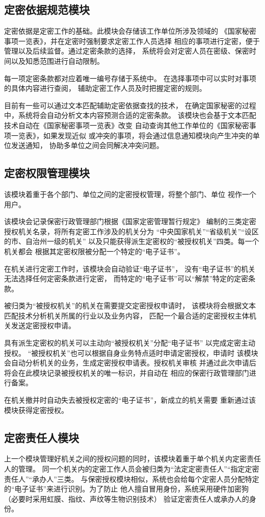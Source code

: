 \subsection{定密依据规范模块}
定密依据是定密工作的基础。此模块会存储该工作单位所涉及领域的
《国家秘密事项一览表》，并在定密时强制要求定密工作人员选择
相应的事项进行定密，便于管理以及后续监督。通过定密条款的选择，
系统将会对定密人员在密级、保密时间以及知悉范围进行自动限制。

每一项定密条款都对应着唯一编号存储于系统中。
在选择事项中可以实时对事项的具体内容进行查阅，
辅助定密工作人员及时把握定密的规则。

目前有一些可以通过文本匹配辅助定密依据查找的技术\cite{yizhonggenjuwendang}，
在确定国家秘密的过程中，系统将会自动分析文本内容预测合适的定密条款。
该模块也会基于文本匹配技术自动在《国家秘密事项一览表》改变
自动查询其他工作单位的《国家秘密事项一览表》，如果发现近似
或冲突的事项，将会通过信息通知模块向产生冲突的单位发送通知，
协助多单位之间会同解决冲突问题。

\subsection{定密权限管理模块}
该模块着重于各个部门、单位之间的定密授权管理，将整个部门、单位
视作一个用户。

该模块会记录保密行政管理部门根据《国家定密管理暂行规定》
编制的三类定密授权机关名录，将所有定密工作涉及的机关分为
“中央国家机关”“省级机关”“设区的市、自治州一级的机关”
以及只能获得派生定密权的“被授权机关”四类。每一个机关都会
根据其定密权限被分配一个特定的“电子证书”。

在机关进行定密工作时，该模块会自动验证“电子证书”，
没有“电子证书”的机关无法选择任何定密条款进行定密，
而特定的“电子证书”可以“解禁”特定的定密条款。

被归类为“被授权机关”的机关在需要提交定密授权申请时，
该模块将会根据文本匹配技术分析机关所属的行业以及业务内容，
匹配一个最合适的定密授权主体机关发送定密授权申请。

具有派生定密权的机关可以主动向“被授权机关”分配“电子证书”
以完成定密主动授权。
“被授权机关”也可以根据自身业务特点适时申请定密授权，申请时
该模块会自动分析机关的业务，生成定密授权申请表。授权机关审核
并通过此次申请后将会在此模块记录被授权机关的唯一标识，并自动在
相应的保密行政管理部门进行备案。

在机关撤并时自动失去被授权定密的“电子证书”，新成立的机关需要
重新通过该模块获得定密授权。

\subsection{定密责任人模块}
上一个模块管理好机关之间的授权问题的同时，该模块着重于单个机关内定密责任人的管理。
同一个机关内的定密工作人员会被归类为“法定定密责任人”“指定定密责任人”“承办人”三类。
与保密授权模块相似，系统也会给每个定密人员分配特定的“电子证书”来进行识别。为了防止
他人擅自冒用身份，系统采用硬件加密狗（必要时采用虹膜、指纹、声纹等生物识别技术）
验证定密责任人或承办人的身份。

